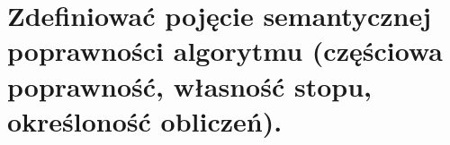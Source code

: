 \section{Zdefiniować pojęcie semantycznej poprawności algorytmu (częściowa poprawność, własność stopu, określoność obliczeń).}

